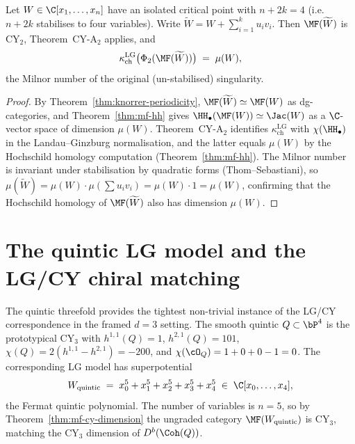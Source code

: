 \begin{proposition}
\label{prop:knorrer-phi-compatibility}
Let $W \in \C[x_1, \ldots, x_n]$ have an isolated critical point with $n + 2k = 4$ (i.e.\ $n + 2k$ stabilises to four variables). Write $\widetilde{W} = W + \sum_{i=1}^k u_i v_i$. Then $\MF(\widetilde{W})$ is CY$_2$, Theorem~CY-A$_2$ applies, and
\[
 \kappa_{\mathrm{ch}}^{\mathrm{LG}}\bigl(\Phi_2(\MF(\widetilde{W}))\bigr) \;=\; \mu(W),
\]
the Milnor number of the original (un-stabilised) singularity.
\end{proposition}

\begin{proof}
By Theorem~\ref{thm:knorrer-periodicity}, $\MF(\widetilde{W}) \simeq \MF(W)$ as dg-categories, and Theorem~\ref{thm:mf-hh} gives $\HH_\bullet(\MF(W)) \simeq \Jac(W)$ as a $\C$-vector space of dimension $\mu(W)$. Theorem~CY-A$_2$ identifies $\kappa_{\mathrm{ch}}^{\mathrm{LG}}$ with $\chi(\HH_\bullet)$ in the Landau--Ginzburg normalisation, and the latter equals $\mu(W)$ by the Hochschild homology computation (Theorem~\ref{thm:mf-hh}). The Milnor number is invariant under stabilisation by quadratic forms (Thom--Sebastiani), so $\mu(\widetilde{W}) = \mu(W) \cdot \mu(\sum u_i v_i) = \mu(W) \cdot 1 = \mu(W)$, confirming that the Hochschild homology of $\MF(\widetilde{W})$ also has dimension $\mu(W)$.
\end{proof}

\section{The quintic LG model and the LG/CY chiral matching}
\label{sec:quintic-lg-detail}

The quintic threefold provides the tightest non-trivial instance of the LG/CY correspondence in the framed $d=3$ setting. The smooth quintic $Q \subset \bP^4$ is the prototypical CY$_3$ with $h^{1,1}(Q) = 1$, $h^{2,1}(Q) = 101$, $\chi(Q) = 2(h^{1,1} - h^{2,1}) = -200$, and $\chi(\cO_Q) = 1 + 0 + 0 - 1 = 0$. The corresponding LG model has superpotential
\[
 W_{\mathrm{quintic}} \;=\; x_0^5 + x_1^5 + x_2^5 + x_3^5 + x_4^5 \;\in\; \C[x_0, \ldots, x_4],
\]
the Fermat quintic polynomial. The number of variables is $n = 5$, so by Theorem~\ref{thm:mf-cy-dimension} the ungraded category $\MF(W_{\mathrm{quintic}})$ is CY$_3$, matching the CY$_3$ dimension of $D^b(\Coh(Q))$.

